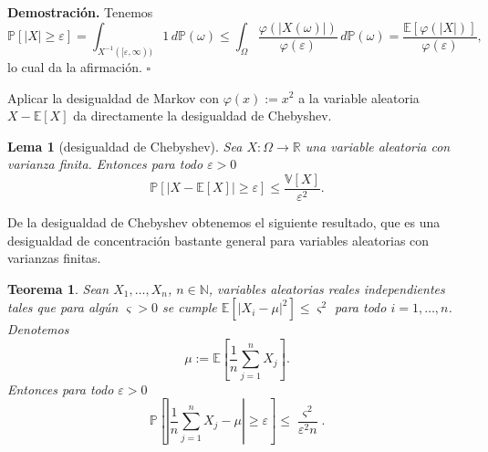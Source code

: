 \documentclass[11pt]{report}
\newenvironment{tcolorbox}[1][]{\par\medskip\noindent\ignorespaces}{\par\medskip}
\theoremstyle{definition}
\theoremstyle{plain}
\newtheorem{teorema}[definicion]{Teorema}
\newtheorem{lema}[definicion]{Lema}
\numberwithin{equation}{section}
\begin{document}
\textbf{Demostración.} Tenemos
\begin{equation*}
    \mathbb{P}[|X|\geq\varepsilon]
    =
    \int_{X^{-1}([\varepsilon,\infty))}1\,d\mathbb{P}(\omega)
    \leq
    \int_\Omega
    \frac{\varphi(|X(\omega)|)}{\varphi(\varepsilon)}
    \,d\mathbb{P}(\omega)
    =
    \frac{\mathbb{E}[\varphi(|X|)]}{\varphi(\varepsilon)},
\end{equation*}
lo cual da la afirmación. \(\square\)

Aplicar la desigualdad de Markov con \(\varphi(x):=x^2\) a la variable aleatoria \(X-\mathbb{E}[X]\) da directamente la desigualdad de Chebyshev.

\begin{tcolorbox}[colback=blue!8, colframe=blue!8, boxrule=0pt]
\begin{lema}[desigualdad de Chebyshev]
Sea \(X:\Omega\to\mathbb{R}\) una variable aleatoria con varianza finita. Entonces para todo \(\varepsilon>0\)
\begin{equation*}
    \mathbb{P}[|X-\mathbb{E}[X]|\geq\varepsilon]
    \leq
    \frac{\mathbb{V}[X]}{\varepsilon^2}.
\end{equation*}
\end{lema}
\end{tcolorbox}

De la desigualdad de Chebyshev obtenemos el siguiente resultado, que es una desigualdad de concentración bastante general para variables aleatorias con varianzas finitas.

\begin{tcolorbox}[colback=blue!8, colframe=blue!8, boxrule=0pt]
\begin{teorema}
Sean \(X_1,\ldots,X_n\), \(n\in\mathbb{N}\), variables aleatorias reales independientes tales que para algún \(\varsigma>0\) se cumple \(\mathbb{E}[|X_i-\mu|^2]\leq \varsigma^2\) para todo \(i=1,\ldots,n\). Denotemos
\begin{equation*}
    \mu:=\mathbb{E}\left[\frac{1}{n}\sum_{j=1}^{n}X_j\right].
    \tag{A.4.2}
\end{equation*}
Entonces para todo \(\varepsilon>0\)
\begin{equation*}
    \mathbb{P}
    \left[
        \left|
            \frac{1}{n}\sum_{j=1}^{n}X_j-\mu
        \right|
        \geq
        \varepsilon
    \right]
    \leq
    \frac{\varsigma^2}{\varepsilon^2 n}.
\end{equation*}
\end{teorema}
\end{tcolorbox}
\end{document}
